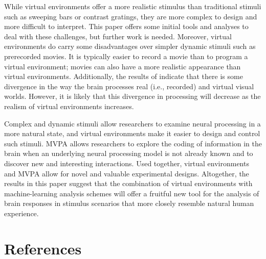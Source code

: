 \documentclass[5p,authoryear]{elsarticle}
\begin{document}
While virtual environments offer a more realistic stimulus than traditional stimuli such as sweeping bars or contrast gratings, they are more complex to design and more difficult to interpret.
This paper offers some initial tools and analyses to deal with these challenges, but further work is needed.
Moreover, virtual environments do carry some disadvantages over simpler dynamic stimuli such as prerecorded movies. 
It is typically easier to record a movie than to program a virtual environment; movies can also have a more realistic appearance than virtual environments.
Additionally, the results of \cite{Han2005} indicate that there is some divergence in the way the brain processes real (i.e., recorded) and virtual visual worlds. 
However, it is likely that this divergence in processing will decrease as the realism of virtual environments increases.

Complex and dynamic stimuli allow researchers to examine neural processing in a more natural state, and virtual environments make it easier to design and control such stimuli.
MVPA allows researchers to explore the coding of information in the brain when an underlying neural processing model is not already known and to discover new and interesting interactions.
Used together, virtual environments and MVPA allow for novel and valuable experimental designs.
Altogether, the results in this paper suggest that the combination of virtual environments with machine-learning analysis schemes will offer a fruitful new tool for the analysis of brain responses in stimulus scenarios that more closely resemble natural human experience.

\section{References}

\end{document}
